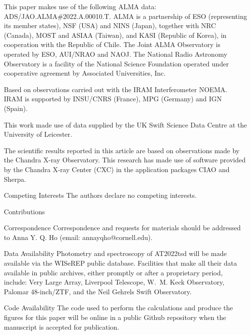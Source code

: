 \documentclass{nature_plusfigure}
\begin{document}
\begin{addendum}
This paper makes use of the following ALMA data: ADS/JAO.ALMA\#2022.A.00010.T. ALMA is a partnership of ESO (representing its member states), NSF (USA) and NINS (Japan), together with NRC (Canada), MOST and ASIAA (Taiwan), and KASI (Republic of Korea), in cooperation with the Republic of Chile. The Joint ALMA Observatory is operated by ESO, AUI/NRAO and NAOJ. The National Radio Astronomy Observatory is a facility of the National Science Foundation operated under cooperative agreement by Associated Universities, Inc.

Based on observations carried out with the IRAM Interferometer NOEMA. IRAM is supported by INSU/CNRS (France), MPG (Germany) and IGN (Spain).

This work made use of data supplied by the UK Swift Science Data Centre at the University of Leicester.

The scientific results reported in this article are based on observations made by the Chandra X-ray Observatory. This research has made use of software provided by the Chandra X-ray Center (CXC) in the application packages CIAO and Sherpa.

 \item[Competing Interests] The authors declare no competing interests.

\item[Contributions] 

 \item[Correspondence] Correspondence and requests for materials
should be addressed to Anna Y. Q. Ho (email: annayqho@cornell.edu).

 \item[Data Availability] Photometry and spectroscopy of AT2022tsd will be made available via the WISeREP public database. Facilities that make all their data available in public archives, either promptly or after a proprietary period, include: Very Large Array, Liverpool Telescope, W.~M. Keck Observatory, Palomar 48-inch/ZTF, 
 and the Neil Gehrels Swift Observatory. 

 \item[Code Availability] The code used to perform the calculations and produce the figures for this paper will be online in a public Github repository when the manuscript is accepted for publication.%

\end{addendum}


\clearpage
\newpage
\end{document}
